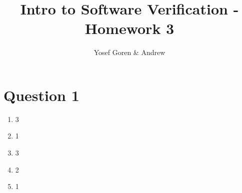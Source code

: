 \documentclass{article}
\begin{document}
\author{Yosef Goren \& Andrew }
\title{Intro to Software Verification - Homework 3}
\maketitle
\section*{Question 1}
\begin{enumerate}[label=\Alph*.]
    \item 3
    \item 1
    \item 3
    \item 2
    \item 1
\end{enumerate}
\end{document}
